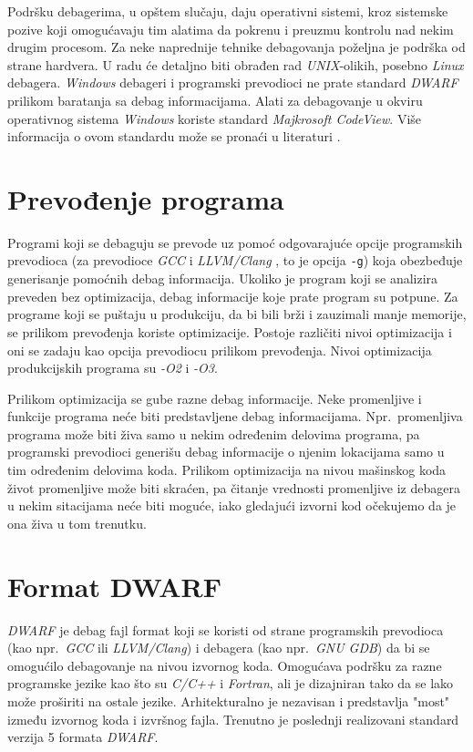 \documentclass[12pt,oneside]{memoir}
\begin{document}
Podršku debagerima, u opštem slučaju, daju operativni sistemi, kroz sistemske pozive koji omogućavaju tim alatima da pokrenu i preuzmu kontrolu nad nekim drugim procesom. Za neke naprednije tehnike debagovanja poželjna je podrška od strane hardvera. U radu će detaljno biti obrađen rad \emph{UNIX}-olikih, posebno \emph{Linux} debagera. \emph{Windows} debageri i programski prevodioci ne prate standard \emph{DWARF} \cite{DWARF} prilikom baratanja sa debag informacijama. Alati za debagovanje u okviru operativnog sistema \emph{Windows} koriste standard \emph{Majkrosoft CodeView}.  Više informacija o ovom standardu može se pronaći u literaturi \cite{CodeView}.

\section{Prevođenje programa}

Programi koji se debaguju se prevode uz pomoć odgovarajuće opcije programskih prevodioca (za prevodioce \emph{GCC} \cite{GCC} i \emph{LLVM/Clang} \cite{LLVM}, to je opcija \texttt{-g}) koja obezbeđuje generisanje pomoćnih debag informacija. Ukoliko je program koji se analizira preveden bez optimizacija, debag informacije koje prate program su potpune. Za programe koji se puštaju u produkciju, da bi bili brži i zauzimali manje memorije, se prilikom prevođenja koriste optimizacije. Postoje različiti nivoi optimizacija i oni se zadaju kao opcija prevodiocu prilikom prevođenja. Nivoi optimizacija produkcijskih programa su \emph{-O2} i \emph{-O3}.

Prilikom optimizacija se gube razne debag informacije. Neke promenljive i funkcije programa neće biti predstavljene debag informacijama. Npr.~promenljiva programa može biti živa samo u nekim određenim delovima programa, pa programski prevodioci generišu debag informacije o njenim lokacijama samo u tim određenim delovima koda. Prilikom optimizacija na nivou mašinskog koda život promenljive može biti skraćen, pa čitanje vrednosti promenljive iz debagera u nekim sitacijama neće biti moguće, iako gledajući izvorni kod očekujemo da je ona živa u tom trenutku.
\newpage
\section{Format DWARF}

\emph{DWARF} je debag fajl format koji se koristi od strane programskih prevodioca (kao npr.~\emph{GCC} ili \emph{LLVM/Clang}) i debagera (kao npr.~\emph{GNU GDB}) da bi se omogućilo debagovanje na nivou izvornog koda. Omogućava podršku za razne programske jezike kao što su \emph{C/C++} i \emph{Fortran}, ali je dizajniran tako da se lako može proširiti na ostale jezike. Arhitekturalno je nezavisan i predstavlja "most" između izvornog koda i izvršnog fajla. Trenutno je poslednji realizovani standard verzija 5 formata \emph{DWARF}.
\end{document}
